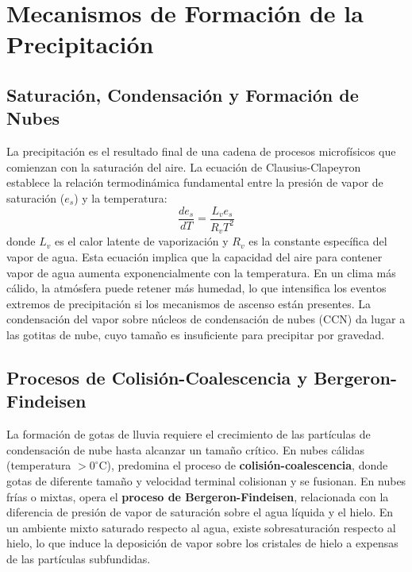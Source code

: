 \section{Mecanismos de Formación de la Precipitación}

\subsection{Saturación, Condensación y Formación de Nubes}
La precipitación es el resultado final de una cadena de procesos microfísicos que comienzan con la saturación del aire. La ecuación de Clausius-Clapeyron establece la relación termodinámica fundamental entre la presión de vapor de saturación (\(e_s\)) y la temperatura:
\begin{equation}
    \frac{de_s}{dT} = \frac{L_v e_s}{R_v T^2}
\end{equation}
donde \(L_v\) es el calor latente de vaporización y \(R_v\) es la constante específica del vapor de agua. Esta ecuación implica que la capacidad del aire para contener vapor de agua aumenta exponencialmente con la temperatura. En un clima más cálido, la atmósfera puede retener más humedad, lo que intensifica los eventos extremos de precipitación si los mecanismos de ascenso están presentes. La condensación del vapor sobre núcleos de condensación de nubes (CCN) da lugar a las gotitas de nube, cuyo tamaño es insuficiente para precipitar por gravedad.

\subsection{Procesos de Colisión-Coalescencia y Bergeron-Findeisen}
La formación de gotas de lluvia requiere el crecimiento de las partículas de condensación de nube hasta alcanzar un tamaño crítico. En nubes cálidas (temperatura \(> 0^\circ\)C), predomina el proceso de \textbf{colisión-coalescencia}, donde gotas de diferente tamaño y velocidad terminal colisionan y se fusionan. En nubes frías o mixtas, opera el \textbf{proceso de Bergeron-Findeisen}, relacionada con la diferencia de presión de vapor de saturación sobre el agua líquida y el hielo. En un ambiente mixto saturado respecto al agua, existe sobresaturación respecto al hielo, lo que induce la deposición de vapor sobre los cristales de hielo a expensas de las partículas subfundidas. 

